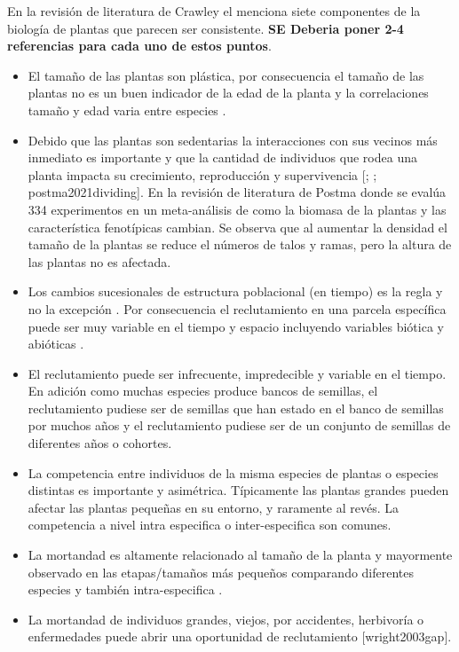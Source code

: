 \documentclass[
]{book}
\providecommand{\tightlist}{%
  \setlength{\itemsep}{0pt}\setlength{\parskip}{0pt}}
\theoremstyle{definition}
\theoremstyle{definition}
\theoremstyle{definition}
\theoremstyle{definition}
\theoremstyle{remark}
\begin{document}
En la revisión de literatura de Crawley \citep{crawley1990population} el menciona siete componentes de la biología de plantas que parecen ser consistente. \textbf{SE Deberia poner 2-4 referencias para cada uno de estos puntos}.

\begin{itemize}
\tightlist
\item
  El tamaño de las plantas son plástica, por consecuencia el tamaño de las plantas no es un buen indicador de la edad de la planta y la correlaciones tamaño y edad varia entre especies \citep{gatsuk1980age, le2004use, vanderklein2007plant, baden2021effects} .
\item
  Debido que las plantas son sedentarias la interacciones con sus vecinos más inmediato es importante y que la cantidad de individuos que rodea una planta impacta su crecimiento, reproducción y supervivencia {[}\citet{mitchell1987analysis}; \citet{pantone1992path}; postma2021dividing{]}. En la revisión de literatura de Postma \citep{postma2021dividing} donde se evalúa 334 experimentos en un meta-análisis de como la biomasa de la plantas y las característica fenotípicas cambian. Se observa que al aumentar la densidad el tamaño de la plantas se reduce el números de talos y ramas, pero la altura de las plantas no es afectada.
\item
  Los cambios sucesionales de estructura poblacional (en tiempo) es la regla y no la excepción \citep{young1987seed, de2013early}. Por consecuencia el reclutamiento en una parcela específica puede ser muy variable en el tiempo y espacio \citep{acacio2007multiple} incluyendo variables biótica y abióticas \citep{luzuriaga2008determines}.
\item
  El reclutamiento puede ser infrecuente, impredecible y variable en el tiempo. En adición como muchas especies produce bancos de semillas, el reclutamiento pudiese ser de semillas que han estado en el banco de semillas por muchos años \citep{saatkamp201411, fenner2017ecology, tomowski2023recruitment} y el reclutamiento pudiese ser de un conjunto de semillas de diferentes años o cohortes.
\item
  La competencia entre individuos de la misma especies de plantas o especies distintas es importante y asimétrica. Típicamente las plantas grandes pueden afectar las plantas pequeñas en su entorno, y raramente al revés. La competencia a nivel intra especifica \citep{weiner1986size, connolly1996asymmetric, weiner2001effects} o inter-especifica \citep[ ]{freckleton2001asymmetric} son comunes.
\item
  La mortandad es altamente relacionado al tamaño de la planta y mayormente observado en las etapas/tamaños más pequeños comparando diferentes especies \citep{moles2006seed} y también intra-especifica \citep{fricke2019linking}.
\item
  La mortandad de individuos grandes, viejos, por accidentes, herbivoría o enfermedades puede abrir una oportunidad de reclutamiento {[}wright2003gap{]}.
\end{itemize}
\end{document}
